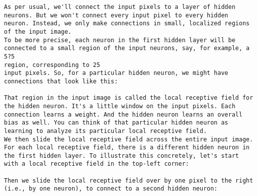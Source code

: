 \begin{lstlisting}
As per usual, we'll connect the input pixels to a layer of hidden neurons. But we won't connect every input pixel to every hidden neuron. Instead, we only make connections in small, localized regions of the input image.
To be more precise, each neuron in the first hidden layer will be connected to a small region of the input neurons, say, for example, a 5?5
region, corresponding to 25
input pixels. So, for a particular hidden neuron, we might have connections that look like this: 

That region in the input image is called the local receptive field for the hidden neuron. It's a little window on the input pixels. Each connection learns a weight. And the hidden neuron learns an overall bias as well. You can think of that particular hidden neuron as learning to analyze its particular local receptive field.
We then slide the local receptive field across the entire input image. For each local receptive field, there is a different hidden neuron in the first hidden layer. To illustrate this concretely, let's start with a local receptive field in the top-left corner: 

Then we slide the local receptive field over by one pixel to the right (i.e., by one neuron), to connect to a second hidden neuron:


\end{lstlisting}
